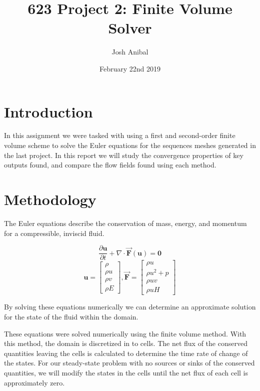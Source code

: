 \documentclass{article}
\title{623 Project 2: Finite Volume Solver}
\author{Josh Anibal}
\date{February 22nd 2019}
\begin{document}
\label{Eqn:DE}
\maketitle

\section*{Introduction}
In this assignment we were tasked with using a first and second-order finite volume scheme to solve the Euler equations for the sequences meshes generated in the last project.
In this report we will study the convergence properties of key outputs found, and compare the flow fields found using each method.



\section*{Methodology}
	The Euler equations describe the conservation of mass, energy, and momentum for a compressible, inviscid fluid.



	\begin{equation}
		\frac{\partial \mathcal{\mathbf{u} }}   {\partial t}
		+ \nabla   \cdot \vec{\mathbf{F}}(\mathbf{u})  = \mathbf{0}
		\label{eqn:Euler}
	\end{equation}
	\begin{equation*}
		\mathbf{u} =
		\begin{bmatrix}
			\rho \\ \rho u \\ \rho v \\ \rho E
		\end{bmatrix}
		,
		\mathbf{\vec{F}} =
		\begin{bmatrix}
			\rho u \\ \rho u^2 + p \\ \rho uv \\ \rho u H
		\end{bmatrix}
	\end{equation*}

	By solving these equations numerically we can determine an approximate solution for the state of the fluid within the domain.

	These equations were solved numerically using the finite volume method.
	With this method, the domain is discretized in to cells.
	The net flux of the conserved quantities leaving the cells is calculated to determine the time rate of change of the states.
	For our steady-state problem with no sources or sinks of the conserved quantities, we will modify the states in the cells until the net flux of each cell is approximately zero.
\end{document}
